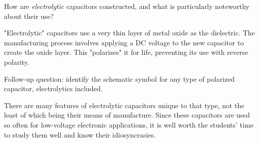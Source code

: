 

How are {\it electrolytic} capacitors constructed, and what is particularly noteworthy about their use?







"Electrolytic" capacitors use a very thin layer of metal oxide as the dielectric.  The manufacturing process involves applying a DC voltage to the new capacitor to create the oxide layer.  This "polarizes" it for life, preventing its use with reverse polarity.

\vskip 10pt

Follow-up question: identify the schematic symbol for any type of polarized capacitor, electrolytics included.







There are many features of electrolytic capacitors unique to that type, not the least of which being their means of manufacture.  Since these capacitors are used so often for low-voltage electronic applications, it is well worth the students' time to study them well and know their idiosyncrasies.




